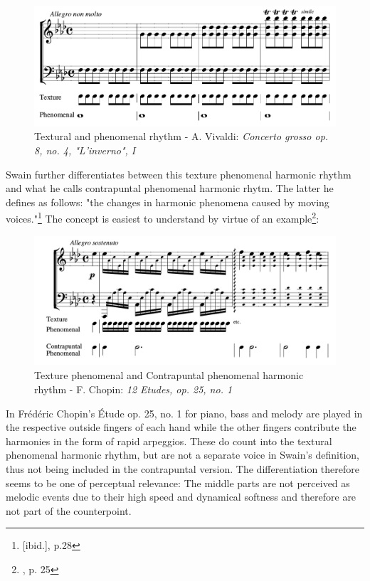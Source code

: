 \documentclass[a4paper,12pt]{report}
\begin{document}
\begin{figure}[h]
\centering
\includegraphics[scale=0.35]{Vivaldi_four_seasons_winter.jpg}
\caption{Textural and phenomenal rhythm - A. Vivaldi: \textit{Concerto grosso op. 8, no. 4, "L'inverno", I}}
\end{figure}

Swain further differentiates between this texture phenomenal harmonic rhythm and what he calls contrapuntal phenomenal harmonic rhytm. The latter he defines as follows: "the changes in harmonic phenomena caused by moving voices."\footnote{[ibid.], p.28} The concept is easiest to understand by virtue of an example\footnote{\cite{swain2002harmonic}, p. 25}:

\begin{figure}[h]
\centering
\includegraphics[scale=0.35]{Chopin_etude_25_1.jpg}
\caption{Texture phenomenal and Contrapuntal phenomenal harmonic rhythm - F. Chopin: \textit{12 Etudes, op. 25, no. 1}}
\end{figure}

In Fr\'{e}d\'{e}ric Chopin's \'{E}tude op. 25, no. 1 for piano, bass and melody are played in the respective outside fingers of each hand while the other fingers contribute the harmonies in the form of rapid arpeggios. These do count into the textural phenomenal harmonic rhythm, but are not a separate voice in Swain's definition, thus not being included in the contrapuntal version. The differentiation therefore seems to be one of perceptual relevance: The middle parts are not perceived as melodic events due to their high speed and dynamical softness and therefore are not part of the counterpoint.
\end{document}

